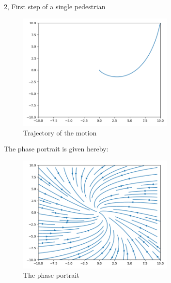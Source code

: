 \documentclass[10pt,a4paper]{article}
\begin{document}
\begin{task}{2, First step of a single pedestrian}
\begin{figure}[H]
\centering
\includegraphics[width=0.7\textwidth]{../plots/task2_part3.png}
\caption{Trajectory of the motion}
\label{fig:task2_3}
\end{figure}

The phase portrait is given hereby:
\begin{figure}[H]
\centering
\includegraphics[width=0.7\textwidth]{../plots/task2_part3_phase.png}
\caption{The phase portrait}
\label{fig:task2_3_phase}
\end{figure}

\end{task}
\end{document}
